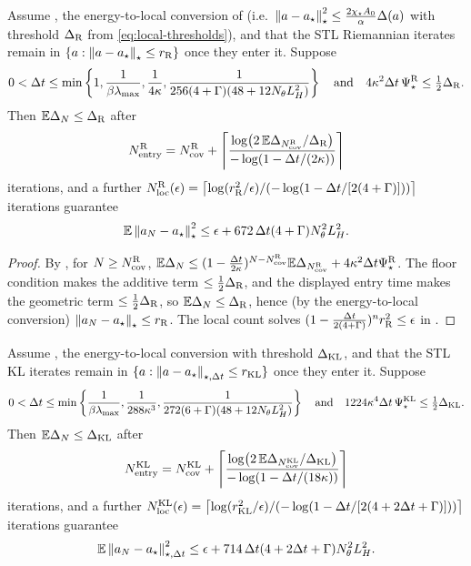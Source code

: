 \begin{theorem}
\label{thm:Riem-STL-global-local}
Assume , the
energy-to-local conversion of  (i.e.\
$\left\lVert a-a_\star\right\rVert_\star^2\leq\tfrac{2\chi_\star A_0}\alpha\Delta(a)$ with threshold
$\Delta_{\mathrm{R}}$ from \eqref{eq:local-thresholds}), and that the STL Riemannian iterates
remain in $\{a:\left\lVert a-a_\star\right\rVert_\star\leq r_{\mathrm{R}}\}$ once they enter it. Suppose
\[
    0<\Delta t\leq
    \min\left\{
        1,\frac1{\beta\lambda_{\max}},\frac1{4\kappa},
        \frac1{256(4+\Gamma)(48+12N_\theta L_H^2)}
    \right\}
    \quad\text{and}\quad
    4\kappa^2\Delta t\,\Psi_\star^{\mathrm{R}}\leq\tfrac12\Delta_{\mathrm{R}}.
\]
Then $\mathbb{E}\Delta_N\leq\Delta_{\mathrm{R}}$ after
\[
    N_{\mathrm{entry}}^{\mathrm{R}}
    =
    N_{\mathrm{cov}}^{\mathrm{R}}
    +
    \left\lceil
        \frac{\log\bigl(2\,\mathbb{E}\Delta_{N_{\mathrm{cov}}^{\mathrm{R}}}/\Delta_{\mathrm{R}}\bigr)}
             {-\log(1-\Delta t/(2\kappa))}
    \right\rceil
\]
iterations, and a further
$N_{\mathrm{loc}}^{\mathrm{R}}(\epsilon)=\bigl\lceil\log(r_{\mathrm{R}}^2/\epsilon)/(-\log(1-\Delta t/[2(4+\Gamma)]))\bigr\rceil$
iterations guarantee
\[
    \mathbb{E}\left\lVert a_N-a_\star\right\rVert_\star^2\leq\epsilon+672\,\Delta t(4+\Gamma)N_\theta^2L_H^2 .
\]
\end{theorem}

\begin{proof}
By , for $N\geq N_{\mathrm{cov}}^{\mathrm{R}}$,
$\mathbb{E}\Delta_N\leq(1-\tfrac{\Delta t}{2\kappa})^{N-N_{\mathrm{cov}}^{\mathrm{R}}}\mathbb{E}\Delta_{N_{\mathrm{cov}}^{\mathrm{R}}}+4\kappa^2\Delta t\Psi_\star^{\mathrm{R}}$.
The floor condition makes the additive term $\leq\tfrac12\Delta_{\mathrm{R}}$, and the displayed
entry time makes the geometric term $\leq\tfrac12\Delta_{\mathrm{R}}$, so $\mathbb{E}\Delta_N\leq\Delta_{\mathrm{R}}$,
hence (by the energy-to-local conversion) $\left\lVert a_N-a_\star\right\rVert_\star\leq r_{\mathrm{R}}$. The local
count solves $(1-\tfrac{\Delta t}{2(4+\Gamma)})^n r_{\mathrm{R}}^2\leq\epsilon$ in
\Cref{assump:local-STL}.
\end{proof}

\begin{theorem}
\label{thm:KL-STL-global-local}
Assume , the
energy-to-local conversion with threshold $\Delta_{\mathrm{KL}}$, and that the STL KL iterates
remain in $\{a:\left\lVert a-a_\star\right\rVert_{\star,\Delta t}\leq r_{\mathrm{KL}}\}$ once they enter it. Suppose
\[
    0<\Delta t\leq
    \min\left\{
        \frac1{\beta\lambda_{\max}},\frac1{288\kappa^3},
        \frac1{272(6+\Gamma)(48+12N_\theta L_H^2)}
    \right\}
    \quad\text{and}\quad
    1224\kappa^4\Delta t\,\Psi_\star^{\mathrm{KL}}\leq\tfrac12\Delta_{\mathrm{KL}}.
\]
Then $\mathbb{E}\Delta_N\leq\Delta_{\mathrm{KL}}$ after
\[
    N_{\mathrm{entry}}^{\mathrm{KL}}
    =
    N_{\mathrm{cov}}^{\mathrm{KL}}
    +
    \left\lceil
        \frac{\log\bigl(2\,\mathbb{E}\Delta_{N_{\mathrm{cov}}^{\mathrm{KL}}}/\Delta_{\mathrm{KL}}\bigr)}
             {-\log(1-\Delta t/(18\kappa))}
    \right\rceil
\]
iterations, and a further
$N_{\mathrm{loc}}^{\mathrm{KL}}(\epsilon)=\bigl\lceil\log(r_{\mathrm{KL}}^2/\epsilon)/(-\log(1-\Delta t/[2(4+2\Delta t+\Gamma)]))\bigr\rceil$
iterations guarantee
\[
    \mathbb{E}\left\lVert a_N-a_\star\right\rVert_{\star,\Delta t}^2\leq\epsilon+714\,\Delta t(4+2\Delta t+\Gamma)N_\theta^2L_H^2 .
\]
\end{theorem}

